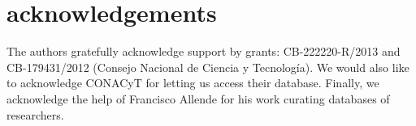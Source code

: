 \documentclass[11pt]{article}
\begin{document}
{%
%
%
%


\section{acknowledgements}
The authors gratefully acknowledge support by grants: CB-222220-R/2013 and
CB-179431/2012 (Consejo Nacional de Ciencia y Tecnolog\'ia). We would also like
to acknowledge CONACyT for letting us access their database. Finally, we
acknowledge the help of Francisco Allende for his work curating 
databases of researchers.








}
\end{document}
